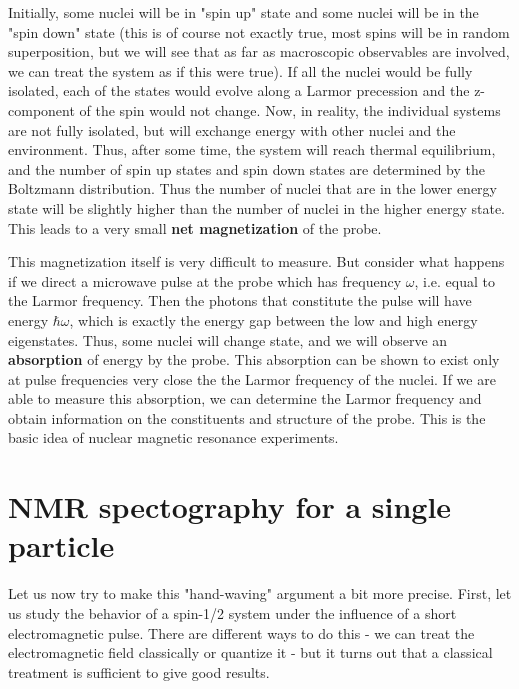 \documentclass[a4paper, draft]{article}
\theoremstyle{own}
\theoremstyle{remark}
\begin{document}
Initially, some nuclei will be in "spin up" state and some nuclei will be in the "spin down" state (this is of course not exactly true, most spins will be in random superposition, but we will see that as far as macroscopic observables are involved, we can treat the system as if this were true). If all the nuclei would be fully isolated, each of the states would evolve along a Larmor precession and the z-component of the spin would not change. Now, in reality, the individual systems are not fully isolated, but will exchange energy with other nuclei and the environment. Thus, after some time, the system will reach thermal equilibrium, and the number of spin up states and spin down states are determined by the Boltzmann distribution. Thus the number of nuclei that are in the lower energy state will be slightly higher than the number of nuclei in the higher energy state. This leads to a very small {\bf net magnetization} of the probe. 

This magnetization itself is very difficult to measure. But consider what happens if we direct a microwave pulse at the probe which has frequency $\omega$, i.e. equal to the Larmor frequency. Then the photons that constitute the pulse will have energy $\hbar \omega$, which is exactly the energy gap between the low and high energy eigenstates. Thus, some nuclei will change state, and we will observe an {\bf absorption} of energy by the probe. This absorption can be shown to exist only at pulse frequencies very close the the Larmor frequency of the nuclei. If we are able to measure this absorption, we can determine the Larmor frequency and obtain information on the constituents and structure of the probe. This is the basic idea of nuclear magnetic resonance experiments.


\section{NMR spectography for a single particle}


Let us now try to make this "hand-waving" argument a bit more precise. First, let us study the behavior of a spin-1/2 system under the influence of a short electromagnetic pulse. There are different ways to do this - we can treat the electromagnetic field classically or quantize it - but it turns out that a classical treatment is sufficient to give good results.
\end{document}
